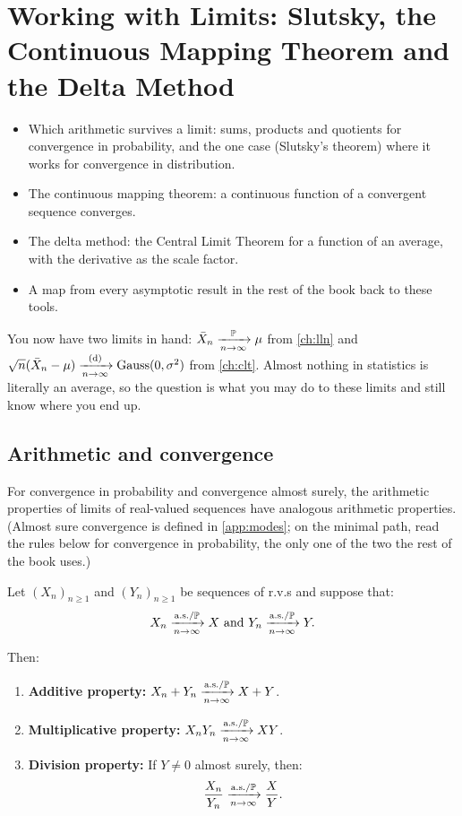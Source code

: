 \chapter[Working with Limits]{Working with Limits: Slutsky, the Continuous Mapping Theorem and the Delta Method}
\label{ch:limit-tools}

\begin{chaptergoals}
\begin{itemize}[nosep]
\item Which arithmetic survives a limit: sums, products and quotients for convergence in probability, and the one case (Slutsky's theorem) where it works for convergence in distribution.
\item The continuous mapping theorem: a continuous function of a convergent sequence converges.
\item The delta method: the Central Limit Theorem for a function of an average, with the derivative as the scale factor.
\item A map from every asymptotic result in the rest of the book back to these tools.
\end{itemize}
You now have two limits in hand: $\bar{X}_n \xrightarrow [n \to \infty ]{\mathbb{P}} \mu$ from \cref{ch:lln} and $\sqrt{n}(\bar{X}_n - \mu) \xrightarrow [n \to \infty ]{\text{(d)}} \text{Gauss}(0, \sigma^2)$ from \cref{ch:clt}. Almost nothing in statistics is literally an average, so the question is what you may do to these limits and still know where you end up.
\end{chaptergoals}

\section{Arithmetic and convergence}
\label{sec:conv-operations}

For convergence in probability and convergence almost surely, the arithmetic properties of limits of real-valued sequences have analogous arithmetic properties.
(Almost sure convergence is defined in \cref{app:modes}; on the minimal path, read the rules below for convergence in probability, the only one of the two the rest of the book uses.)

Let $(X_n)_{n \geq 1}$ and $(Y_n)_{n \geq 1}$ be sequences of r.v.s and suppose that:
\[
X_n \xrightarrow [n \to \infty ]{\text{a.s.}/\mathbb{P}} X \text{ and } Y_n \xrightarrow [n \to \infty ]{\text{a.s.}/\mathbb{P}} Y.
\]

Then:
\begin{enumerate}
\item \textbf{Additive property:} $X_n + Y_n \xrightarrow [n \to \infty ]{\text{a.s.}/\mathbb{P}} X + Y$.

\item \textbf{Multiplicative property:} $X_n Y_n \xrightarrow [n \to \infty ]{\text{a.s.}/\mathbb{P}} XY$.

\item \textbf{Division property:} If $Y \neq 0$ almost surely, then:
\[
\frac{X_n}{Y_n} \xrightarrow [n \to \infty ]{\text{a.s.}/\mathbb{P}} \frac{X}{Y}.
\]
\end{enumerate}

